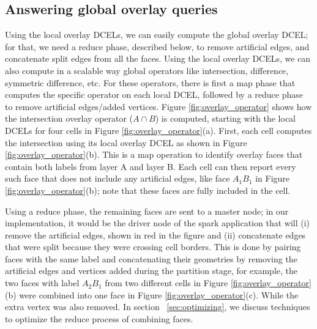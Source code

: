 \vspace{4pt}


\subsection{Answering global overlay queries} \label{sec:reduce}


Using the local overlay DCELs, we can easily compute the global overlay DCEL; for that, we need a reduce phase, described below, to remove artificial edges, and concatenate split edges from all the faces. Using the local overlay DCELs, we can also compute in a scalable way global operators like intersection, difference, symmetric difference, etc. For these operators, there is first a map phase that computes the specific operator on each local DCEL, followed by a reduce phase to remove artificial edges/added vertices.
Figure \ref{fig:overlay_operator} shows how the intersection overlay operator ($A \cap B$) is computed, starting with the local DCELs for four cells in Figure \ref{fig:overlay_operator}(a). First, each cell computes the intersection using its local overlay DCEL as shown in Figure \ref{fig:overlay_operator}(b). This is a map operation to identify overlay faces that contain both labels from layer A and layer B. Each cell can then report every such face that does not include any artificial edges, like face $A_1B_1$ in Figure \ref{fig:overlay_operator}(b); note that these faces are fully included in the cell. 

Using a reduce phase, the remaining faces are sent to a master node; in our implementation, it would be the driver node of the spark application that will (i) remove the artificial edges, shown in red in the figure and (ii) concatenate edges that were split because they were crossing cell borders. This is done by pairing faces with the same label and concatenating their geometries by removing the artificial edges and vertices added during the partition stage, for example, the two faces with label $A_2B_1$ from two different cells in Figure \ref{fig:overlay_operator}(b) were combined into one face in Figure \ref{fig:overlay_operator}(c). While the extra vertex was also removed. In section ~\ref{sec:optimizing}, we discuss techniques to optimize the reduce process of combining faces.

